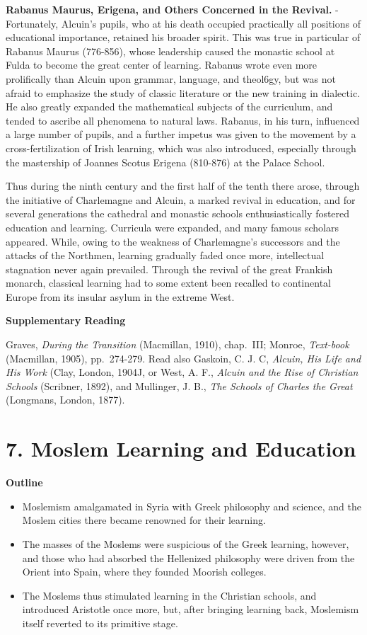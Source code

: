 \documentclass[
]{book}
\providecommand{\tightlist}{%
  \setlength{\itemsep}{0pt}\setlength{\parskip}{0pt}}
\begin{document}
\textbf{Rabanus Maurus, Erigena, and Others Concerned in the Revival.} - Fortunately, Alcuin's pupils, who at his death occupied practically all positions of educational importance, retained his broader spirit. This was true in particular of Rabanus Maurus (776-856), whose leadership caused the monastic school at Fulda to become the great center of learning. Rabanus wrote even more prolifically than Alcuin upon grammar, language, and theol6gy, but was not afraid to emphasize the study of classic literature or the new training in dialectic. He also greatly expanded the mathematical subjects of the curriculum, and tended to ascribe all phenomena to natural laws. Rabanus, in his turn, influenced a large number of pupils, and a further impetus was given to the movement by a cross-fertilization of Irish learning, which was also introduced, especially through the mastership of Joannes Scotus Erigena (810-876) at the Palace School.

Thus during the ninth century and the first half of the tenth there arose, through the initiative of Charlemagne and Alcuin, a marked revival in education, and for several generations the cathedral and monastic schools enthusiastically fostered education and learning. Curricula were expanded, and many famous scholars appeared. While, owing to the weakness of Charlemagne's successors and the attacks of the Northmen, learning gradually faded once more, intellectual stagnation never again prevailed. Through the revival of the great Frankish monarch, classical learning had to some extent been recalled to continental Europe from its insular asylum in the extreme West.

\textbf{Supplementary Reading}

Graves, \emph{During the Transition} (Macmillan, 1910), chap.~III; Monroe, \emph{Text-book} (Macmillan, 1905), pp.~274-279. Read also Gaskoin, C. J. C, \emph{Alcuin, His Life and His Work} (Clay, London, 1904J, or West, A. F., \emph{Alcuin and the Rise of Christian Schools} (Scribner, 1892), and Mullinger, J. B., \emph{The Schools of Charles the Great} (Longmans, London, 1877).

\hypertarget{moslem-learning-and-education}{%
\chapter{7. Moslem Learning and Education}\label{moslem-learning-and-education}}

\textbf{Outline}

\begin{itemize}
\tightlist
\item
  Moslemism amalgamated in Syria with Greek philosophy and science, and the Moslem cities there became renowned for their learning.
\item
  The masses of the Moslems were suspicious of the Greek learning, however, and those who had absorbed the Hellenized philosophy were driven from the Orient into Spain, where they founded Moorish colleges.
\item
  The Moslems thus stimulated learning in the Christian schools, and introduced Aristotle once more, but, after bringing learning back, Moslemism itself reverted to its primitive stage.
\end{itemize}
\end{document}

